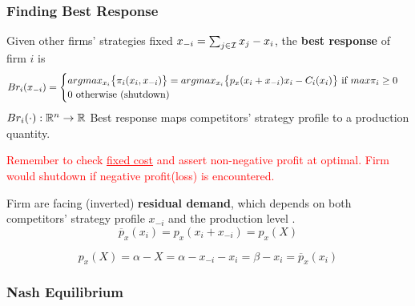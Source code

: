 \documentclass[]{article}
\begin{document}
            \subsubsection{Finding Best Response}
                \begin{definition}
                    Given other firms' strategies fixed $x_{-i} = \sum_{j \in \mathcal{{I}}}{x_j} - x_i$, the \textbf{best response} of firm $i$ is 
                    \[
                        Br_i(x_{-i}) = 
                        \begin{cases}
                            argmax_{x_i} \big \{ {\pi_i(x_i, x_{-i})} \big \}
                            = argmax_{x_i} \big \{ {p_x(x_i+x_{-i})x_i - C_i(x_i) \big \}
                            \text{{ if }} max{\pi_i}} \geq 0\\
                            0 \text{{ otherwise (shutdown)}} \\
                        \end{cases}
                    \]
                    $Br_i(\cdot): \mathbb{R}^n \rightarrow \mathbb{R}$ Best response maps competitors' strategy profile to a production quantity.
                \end{definition}
                
                \textcolor{red}{
                \begin{remark}
                    Remember to check \ul{fixed cost} and assert non-negative profit at optimal. Firm would shutdown if negative profit(loss) is encountered.
                \end{remark}
                }
                
                \begin{definition}
                    Firm are facing (inverted) \textbf{residual demand}, which depends on both competitors' strategy profile $x_{-i}$ and the production level .
                    \[
                        \overline{p}_x(x_i) = p_x(x_i + x_{-i}) = p_x(X)
                    \]
                \end{definition}
                
                \begin{example}
                    \[
                        p_x(X) = \alpha - X = \alpha - x_{-i} - x_i = \beta - x_i = \overline{p}_x(x_i)
                    \]
                \end{example}
                
            \subsubsection{Nash Equilibrium}
\end{document}
